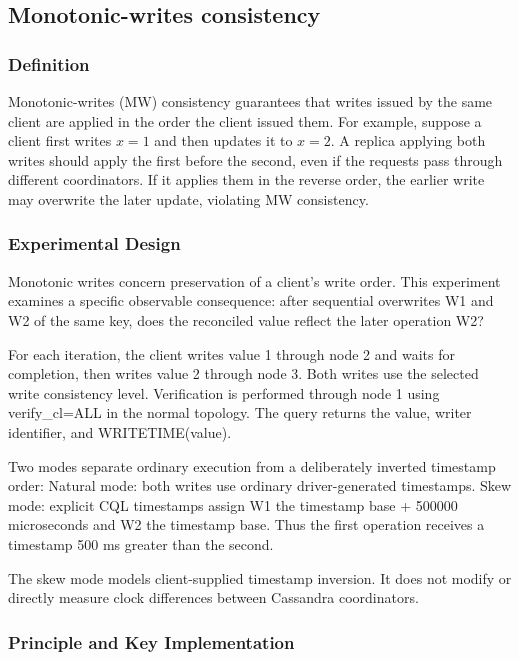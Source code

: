 \subsection{Monotonic-writes consistency}\label{mw:monotonic-writes-consistency}

\subsubsection{Definition}\label{mw:definition}

Monotonic-writes (MW) consistency guarantees that writes issued by the same client are applied in the order the client issued them. For example, suppose a client first writes \(x=1\) and then updates it to \(x=2\). A replica applying both writes should apply the first before the second, even if the requests pass through different coordinators. If it applies them in the reverse order, the earlier write may overwrite the later update, violating MW consistency.

\subsubsection{Experimental Design}\label{mw:experimental-design}

Monotonic writes concern preservation of a client's write order. This experiment examines a specific observable consequence: after sequential overwrites W1 and W2 of the same key, does the reconciled value reflect the later operation W2?

For each iteration, the client writes value 1 through node 2 and waits for completion, then writes value 2 through node 3. Both writes use the selected write consistency level. Verification is performed through node 1 using verify\_cl=ALL in the normal topology. The query returns the value, writer identifier, and WRITETIME(value).

Two modes separate ordinary execution from a deliberately inverted timestamp order: Natural mode: both writes use ordinary driver-generated timestamps. Skew mode: explicit CQL timestamps assign W1 the timestamp base + 500000 microseconds and W2 the timestamp base. Thus the first operation receives a timestamp 500 ms greater than the second.

The skew mode models client-supplied timestamp inversion. It does not modify or directly measure clock differences between Cassandra coordinators.

\subsubsection{Principle and Key Implementation}\label{mw:principle-and-key-implementation}

